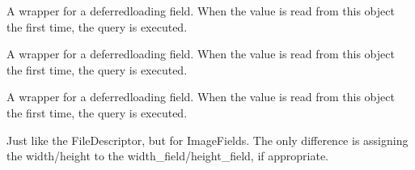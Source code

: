 \documentclass[letterpaper,10pt,french]{sphinxmanual}
\begin{document}
\begin{fulllineitems}
\begin{fulllineitems}
\label{\detokenize{main/model:main.models.Utilisateur.lieunaissance}}
\pysigstartsignatures
{}
\pysigstopsignatures
\sphinxAtStartPar
A wrapper for a deferred\sphinxhyphen{}loading field. When the value is read from this
object the first time, the query is executed.

\end{fulllineitems}


\begin{fulllineitems}
\label{\detokenize{main/model:main.models.Utilisateur.nationalite}}
\pysigstartsignatures
{}
\pysigstopsignatures
\sphinxAtStartPar
A wrapper for a deferred\sphinxhyphen{}loading field. When the value is read from this
object the first time, the query is executed.

\end{fulllineitems}


\begin{fulllineitems}
\label{\detokenize{main/model:main.models.Utilisateur.nom}}
\pysigstartsignatures
{}
\pysigstopsignatures
\sphinxAtStartPar
A wrapper for a deferred\sphinxhyphen{}loading field. When the value is read from this
object the first time, the query is executed.

\end{fulllineitems}


\begin{fulllineitems}
\label{\detokenize{main/model:main.models.Utilisateur.photo_passport}}
\pysigstartsignatures
{}
\pysigstopsignatures
\sphinxAtStartPar
Just like the FileDescriptor, but for ImageFields. The only difference is
assigning the width/height to the width\_field/height\_field, if appropriate.

\end{fulllineitems}


\end{fulllineitems}
\end{document}
